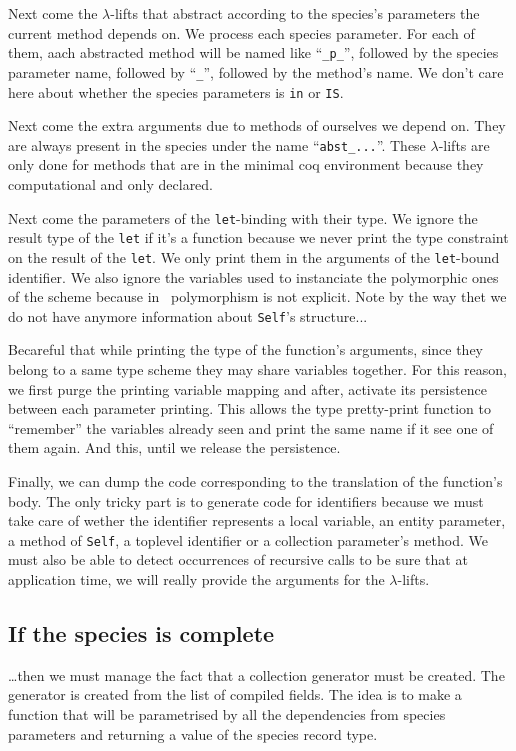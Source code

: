 \medskip
Next come the $\lambda$-lifts that abstract according to the species's
parameters the current method depends on. We process each species
parameter. For each of them, aach abstracted method will be named like
``{\tt \_p\_}'', followed by the species parameter name, followed by
``{\tt \_}'', followed by the method's name. We don't care here about
whether the species parameters is {\tt in} or {\tt IS}.

\medskip
Next come the extra arguments due to methods of ourselves we depend
on. They are always present in the species under the name
``{\tt abst\_...}''. These $\lambda$-lifts are only done for methods
that are in the minimal coq environment because they computational and
only declared.

\medskip
Next come the parameters of the {\tt let}-binding with their type. We
ignore the result type of the {\tt let} if it's a function because we
never print the type constraint on the result of the {\tt let}. We
only print them in the arguments of the {\tt let}-bound identifier.
We also ignore the variables used to instanciate the polymorphic ones
of the scheme because in \ocaml\ polymorphism is not explicit.   
Note by the way thet we do not have anymore information about
{\tt Self}'s structure...

Becareful that while printing the type of the function's arguments,
since they belong to a same type scheme they may share variables
together. For this reason, we first purge the printing variable
mapping and after, activate its persistence between each parameter
printing. This allows the type pretty-print function to ``remember''
the variables already seen and print the same name if it see one of
them again. And this, until we release the persistence.

\medskip
Finally, we can dump the code corresponding to the translation of the
function's body. The only tricky part is to generate code for
identifiers because we must take care of wether the identifier
represents a local variable, an entity parameter, a method of
{\tt Self}, a toplevel identifier or a collection parameter's method.
We must also be able to detect occurrences of recursive calls to be
sure that at application time, we will really provide the arguments
for the $\lambda$-lifts.

\subsection{If the species is complete}
\ldots then we must manage the fact that a collection generator must
be created. The generator is created from the list of compiled fields.
The idea is to make a function that will be parametrised by all the
dependencies from species parameters and returning a value of the
species record type.

